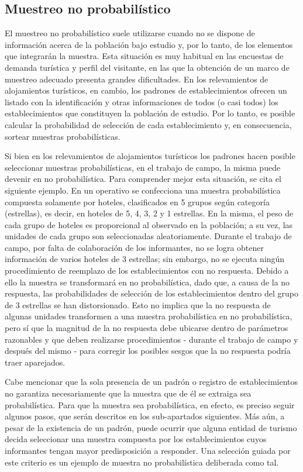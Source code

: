 \documentclass[
]{book}
\begin{document}
\hypertarget{muestreo-no-probabiluxedstico}{%
\subsection{Muestreo no probabilístico}\label{muestreo-no-probabiluxedstico}}

El muestreo no probabilístico suele utilizarse cuando no se dispone de información acerca de la población bajo estudio y, por lo tanto, de los elementos que integrarán la muestra. Esta situación es muy habitual en las encuestas de demanda turística y perfil del visitante, en las que la obtención de un marco de muestreo adecuado presenta grandes dificultades. En los relevamientos de alojamientos turísticos, en cambio, los padrones de establecimientos ofrecen un listado con la identificación y otras informaciones de todos (o casi todos) los establecimientos que constituyen la población de estudio. Por lo tanto, es posible calcular la probabilidad de selección de cada establecimiento y, en consecuencia, sortear muestras probabilísticas.

Si bien en los relevamientos de alojamientos turísticos los padrones hacen posible seleccionar muestras probabilísticas, en el trabajo de campo, la misma puede devenir en no probabilística. Para comprender mejor esta situación, se cita el siguiente ejemplo. En un operativo se confecciona una muestra probabilística compuesta solamente por hoteles, clasificados en 5 grupos según categoría (estrellas), es decir, en hoteles de 5, 4, 3, 2 y 1 estrellas. En la misma, el peso de cada grupo de hoteles es proporcional al observado en la población; a su vez, las unidades de cada grupo son seleccionadas aleatoriamente. Durante el trabajo de campo, por falta de colaboración de los informantes, no se logra obtener información de varios hoteles de 3 estrellas; sin embargo, no se ejecuta ningún procedimiento de reemplazo de los establecimientos con no respuesta. Debido a ello la muestra se transformará en no probabilística, dado que, a causa de la no respuesta, las probabilidades de selección de los establecimientos dentro del grupo de 3 estrellas se han distorsionado. Esto no implica que la no respuesta de algunas unidades transformen a una muestra probabilística en no probabilística, pero sí que la magnitud de la no respuesta debe ubicarse dentro de parámetros razonables y que deben realizarse procedimientos - durante el trabajo de campo y después del mismo - para corregir los posibles sesgos que la no respuesta podría traer aparejados.

Cabe mencionar que la sola presencia de un padrón o registro de establecimientos no garantiza necesariamente que la muestra que de él se extraiga sea probabilística. Para que la muestra sea probabilística, en efecto, es preciso seguir algunos pasos, que serán descritos en los sub-apartados siguientes. Más aún, a pesar de la existencia de un padrón, puede ocurrir que alguna entidad de turismo decida seleccionar una muestra compuesta por los establecimientos cuyos informantes tengan mayor predisposición a responder. Una selección guiada por este criterio es un ejemplo de muestra no probabilística deliberada como tal.
\end{document}
